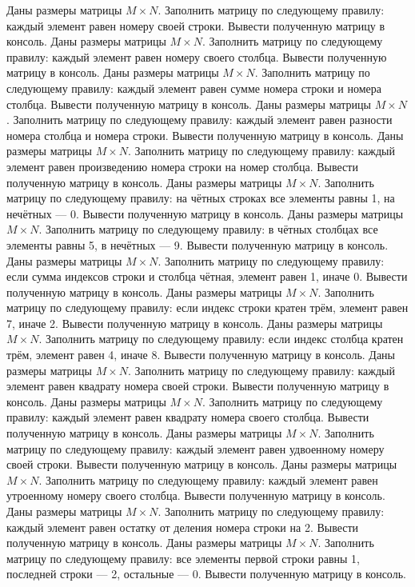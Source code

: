 Даны размеры матрицы $M \times N$. Заполнить матрицу по следующему правилу: каждый элемент равен номеру своей строки. Вывести полученную матрицу в консоль.
Даны размеры матрицы $M \times N$. Заполнить матрицу по следующему правилу: каждый элемент равен номеру своего столбца. Вывести полученную матрицу в консоль.
Даны размеры матрицы $M \times N$. Заполнить матрицу по следующему правилу: каждый элемент равен сумме номера строки и номера столбца. Вывести полученную матрицу в консоль.
Даны размеры матрицы $M \times N$. Заполнить матрицу по следующему правилу: каждый элемент равен разности номера столбца и номера строки. Вывести полученную матрицу в консоль.
Даны размеры матрицы $M \times N$. Заполнить матрицу по следующему правилу: каждый элемент равен произведению номера строки на номер столбца. Вывести полученную матрицу в консоль.
Даны размеры матрицы $M \times N$. Заполнить матрицу по следующему правилу: на чётных строках все элементы равны 1, на нечётных --- 0. Вывести полученную матрицу в консоль.
Даны размеры матрицы $M \times N$. Заполнить матрицу по следующему правилу: в чётных столбцах все элементы равны 5, в нечётных --- 9. Вывести полученную матрицу в консоль.
Даны размеры матрицы $M \times N$. Заполнить матрицу по следующему правилу: если сумма индексов строки и столбца чётная, элемент равен 1, иначе 0. Вывести полученную матрицу в консоль.
Даны размеры матрицы $M \times N$. Заполнить матрицу по следующему правилу: если индекс строки кратен трём, элемент равен 7, иначе 2. Вывести полученную матрицу в консоль.
Даны размеры матрицы $M \times N$. Заполнить матрицу по следующему правилу: если индекс столбца кратен трём, элемент равен 4, иначе 8. Вывести полученную матрицу в консоль.
Даны размеры матрицы $M \times N$. Заполнить матрицу по следующему правилу: каждый элемент равен квадрату номера своей строки. Вывести полученную матрицу в консоль.
Даны размеры матрицы $M \times N$. Заполнить матрицу по следующему правилу: каждый элемент равен квадрату номера своего столбца. Вывести полученную матрицу в консоль.
Даны размеры матрицы $M \times N$. Заполнить матрицу по следующему правилу: каждый элемент равен удвоенному номеру своей строки. Вывести полученную матрицу в консоль.
Даны размеры матрицы $M \times N$. Заполнить матрицу по следующему правилу: каждый элемент равен утроенному номеру своего столбца. Вывести полученную матрицу в консоль.
Даны размеры матрицы $M \times N$. Заполнить матрицу по следующему правилу: каждый элемент равен остатку от деления номера строки на 2. Вывести полученную матрицу в консоль.
Даны размеры матрицы $M \times N$. Заполнить матрицу по следующему правилу: все элементы первой строки равны 1, последней строки --- 2, остальные --- 0. Вывести полученную матрицу в консоль.
